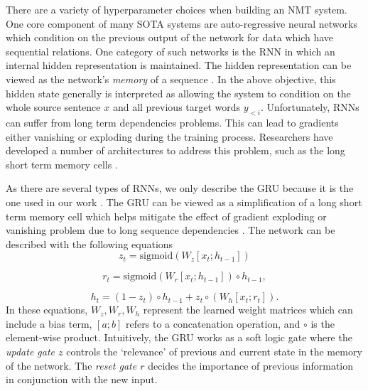 There are a variety of hyperparameter choices when building an \ac{NMT} system. One core component of many \ac{SOTA} systems are auto-regressive neural networks which condition on the previous output of the network for data which have sequential relations. One category of such networks is the \ac{RNN} in which an internal hidden representation is maintained. The hidden representation can be viewed as the network's \textit{memory} of a sequence \cite{gravessupervisedSequenceRNNbook2012}. In the above objective, this hidden state generally is interpreted as allowing the system to condition on the whole source sentence $x$ and all previous target words $y_{<i}$. Unfortunately, \ac{RNN}s can suffer from long term dependencies problems. This can lead to gradients either vanishing or exploding during the training process. Researchers have developed a number of architectures to address this problem, such as the long short term memory cells \cite{gravessupervisedSequenceRNNbook2012}.

As there are several types of \ac{RNN}s, we only describe the \ac{GRU} because it is the one used in our work \cite{cho2014GRU}. The \ac{GRU} can be viewed as a simplification of a long short term memory cell which helps mitigate the effect of gradient exploding or vanishing problem due to long sequence dependencies \cite{gravessupervisedSequenceRNNbook2012}. The network can be described with the following equations
\begin{equation}
	z_{t} = \text{sigmoid}(W_{z}[x_{t}; h_{t-1} ] ) %
\end{equation}

\begin{equation} 
	r_{t} = \text{sigmoid}(W_{r} [x_{t}; h_{t-1}] )  \circ h_{t-1},%
\end{equation}

\begin{equation}
	h_{t} = (1 - z_{t}) \circ h_{t-1} + z_{t} \circ (W_{h} [x_{t}; r_{t} ]). %
\end{equation}
In these equations, $W_{z}, W_{r}, W_{h}$ represent the learned weight matrices which can include a bias term,  $[a ; b]$ refers to a concatenation operation, and $\circ$ is the element-wise product. Intuitively, the \ac{GRU} works as a soft logic gate where the \textit{update gate $z$} controls the `relevance' of previous and current state in the memory of the network. The \textit{reset gate $r$} decides the importance of previous information in conjunction with the new input. 


